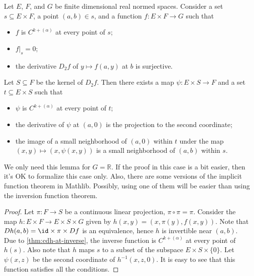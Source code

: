 \begin{lemma}%
  \label{thm:cdh-at-implicit-ker}
  Let \(E\), \(F\), and \(G\) be finite dimensional real normed spaces.
  Consider a set \(s \subseteq E \times F\), a point \((a, b) \in s\), and a function \(f\colon E \times F \to G\) such that
  \begin{itemize}
  \item \(f\) is \(C^{k+(\alpha)}\) at every point of \(s\);
  \item \(\left.f\right|_{s}=0\);
  \item the derivative \(D_{2}f\) of \(y \mapsto f(a, y)\) at \(b\) is surjective.
  \end{itemize}
  Let \(S \subseteq F\) be the kernel of \(D_{2}f\).
  Then there exists a map \(\psi\colon E \times S \to F\) and a set \(t \subseteq E \times S\) such that
  \begin{itemize}
  \item \(\psi\) is \(C^{k+(\alpha)}\) at every point of \(t\);
  \item the derivative of \(\psi\) at \((a, 0)\) is the projection to the second coordinate;
  \item the image of a small neighborhood of \((a, 0)\) within \(t\) under the map \((x, y)\mapsto (x, \psi(x, y))\)
    is a small neighborhood of \((a, b)\) within \(s\).
  \end{itemize}
\end{lemma}

\begin{remark}
  We only need this lemma for \(G=\mathbb R\).
  If the proof in this case is a bit easier, then it's OK to formalize this case only.
  Also, there are some versions of the implicit function theorem in Mathlib.
  Possibly, using one of them will be easier than using the inversion function theorem.
\end{remark}

\begin{proof}
  Let \(\pi\colon F\to S\) be a continuous linear projection, \(\pi \circ \pi = \pi\).
  Consider the map \(h\colon E \times F \to E \times S \times G\)
  given by \(h(x, y) = (x, \pi(y), f(x, y))\).
  Note that \(Dh(a, b) = \id \times \pi \times Df\) is an equivalence,
  hence \(h\) is invertible near \((a, b)\).
  Due to \autoref{thm:cdh-at-inverse}, the inverse function is \(C^{k+(\alpha)}\) at every point of \(h(s)\).
  Also note that \(h\) maps \(s\) to a subset of the subspace \(E\times S\times \{0\}\).
  Let \(\psi(x, z)\) be the second coordinate of \(h^{-1}(x, z, 0)\).
  It is easy to see that this function satisfies all the conditions.
\end{proof}

